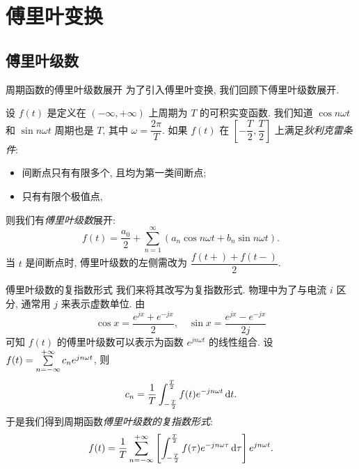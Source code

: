 \section{傅里叶变换}

\subsection{傅里叶级数}

\begin{frame}{周期函数的傅里叶级数展开}
	\onslide<+->
	为了引入傅里叶变换, 我们回顾下傅里叶级数展开.

	\onslide<+->
	设 $f(t)$ 是定义在 $(-\infty,+\infty)$ 上周期为 $T$ 的可积实变函数.
	\onslide<+->
	我们知道 $\cos n\omega t$ 和 $\sin n\omega t$ 周期也是 $T$, 其中 $\omega=\dfrac{2\pi}T$.
	\onslide<+->
	如果 $f(t)$ 在 $\left[-\dfrac T2,\dfrac T2\right]$ 上满足\emph{狄利克雷条件}:
	\begin{itemize}
		\item 间断点只有有限多个, 且均为第一类间断点;
		\item 只有有限个极值点,
	\end{itemize}
	\onslide<+->
	则我们有\emph{傅里叶级数}展开:
	\[f(t)=\frac{a_0}2+\sum_{n=1}^\infty \left(a_n\cos n\omega t+b_n \sin n\omega t\right).\]
	\onslide<+->
	当 $t$ 是间断点时, 傅里叶级数的左侧需改为 $\dfrac{f(t+)+f(t-)}2$.
\end{frame}


\begin{frame}{傅里叶级数的复指数形式}
	\onslide<+->
	我们来将其改写为复指数形式.
	\onslide<+->
	物理中为了与电流 $i$ 区分, 通常用 $j$ 来表示虚数单位.
	\onslide<+->
	由
	\[\cos x=\frac{e^{jx}+e^{-jx}}2,\quad \sin x=\frac{e^{jx}-e^{-jx}}{2j}\]
	\onslide<+->
	可知 $f(t)$ 的傅里叶级数可以表示为函数 $e^{jn\omega t}$ 的线性组合.
	\onslide<+->
	设 $f(t)=\sum\limits_{n=-\infty}^{+\infty} c_n e^{jn\omega t}$, 则
	\[c_n=\frac 1T \int_{-\frac T2}^{\frac T2} f(t)e^{-jn\omega t} \,\mathrm{d} t.\]
	\onslide<+->
	于是我们得到周期函数\emph{傅里叶级数的复指数形式}:
	\[f(t)=\frac 1T\sum_{n=-\infty}^{+\infty}\left[\int_{-\frac T2}^{\frac T2}f(\tau)e^{-jn\omega\tau} \,\mathrm{d}\tau\right] e^{jn\omega t}.\]
\end{frame}


